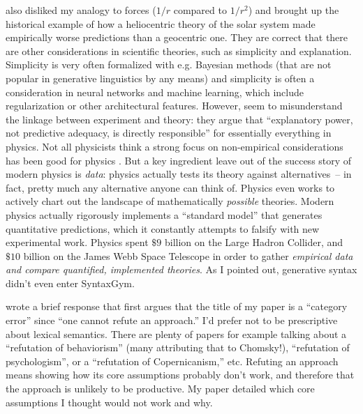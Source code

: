 \documentclass[output=paper,colorlinks,citecolor=brown]{langscibook}
\begin{document}
\citet{rawski2023modern} also disliked my analogy to forces ($1/r$ compared to $1/r^2$) and brought up the historical example of how a heliocentric theory of the solar system made empirically worse predictions than a geocentric one. They are correct that there are other considerations in scientific theories, such as simplicity and explanation. Simplicity is very often formalized with e.g. Bayesian methods (that are not popular in generative linguistics by any means) and simplicity is often a consideration in neural networks and machine learning, which include regularization or other architectural features. However, \citet{rawski2023modern} seem to misunderstand the linkage between experiment and theory: they argue that ``explanatory power, not predictive adequacy, is directly responsible'' for essentially everything in physics. Not all physicists think a strong focus on non-empirical considerations has been good for physics \citep{hossenfelder2018lost}. But a key ingredient \citet{rawski2023modern} leave out of the success story of modern physics is \textit{data}: physics actually tests its theory against alternatives~-- in fact, pretty much any alternative anyone can think of. Physics even works to actively chart out the landscape of mathematically \textit{possible} theories. Modern physics actually rigorously implements a ``standard model'' that generates quantitative predictions, which it constantly attempts to falsify with new experimental work. Physics spent $\$9$ billion on the Large Hadron Collider, and $\$10$ billion on the James Webb Space Telescope in order to gather \textit{empirical data and compare quantified, implemented theories}. As I pointed out, generative syntax didn't even enter SyntaxGym. 

\citet{milway2023response} wrote a brief response that first argues that the title of my paper is a ``category error'' since ``one cannot refute an approach.'' I'd prefer not to be prescriptive about lexical semantics. There are plenty of papers for example talking about a ``refutation of behaviorism'' (many attributing that to Chomsky!), ``refutation of psychologism'', or a ``refutation of Copernicanism,'' etc. Refuting an approach means showing how its core assumptions probably don't work, and therefore that the approach is unlikely to be productive. My paper detailed which core assumptions I thought would not work and why. 
\end{document}
